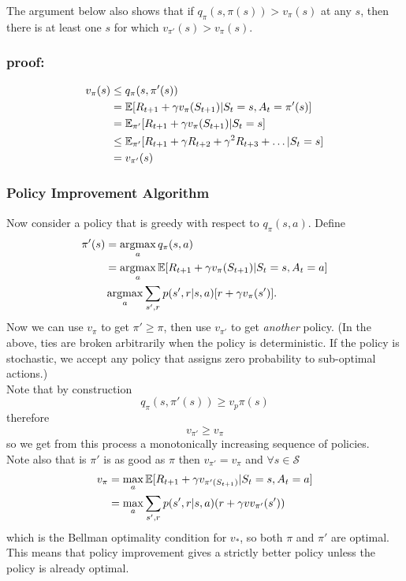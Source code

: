 The argument below also shows that if $q_\pi(s, \pi(s)) > v_\pi(s)$ at any $s$, then there is at least one $s$ for which $v_{\pi'}(s) > v_\pi(s)$.
\subsubsection*{proof:}
\begin{align*}
    v_\pi(s) & \leq q_\pi(s, \pi'(s)) \\
             & = \mathbb{E}{}[R_{t+1} + \gamma v_\pi(S_{t+1}) | S_t=s, A_t=\pi'(s)] \\
             & = \mathbb{E}{}_{\pi'} [R_{t+1} + \gamma v_\pi(S_{t+1}) | S_t=s] \\
             & \leq \mathbb{E}{}_{\pi'} [R_{t+1} + \gamma R_{t+2} + \gamma^2 R_{t+3} + \dots| S_t=s] \\
             & = v_{\pi'}(s)
\end{align*}

\subsubsection*{Policy Improvement Algorithm}
Now consider a policy that is greedy with respect to $q_\pi(s, a)$. Define 
\begin{align}
    \pi'(s) &= \operatorname*{argmax}_a q_\pi(s, a) \\ 
            &= \operatorname*{argmax}_a \mathbb{E}{} [R_{t+1} + \gamma v_\pi(S_{t+1}) | S_t=s, A_t=a] \\
            & \operatorname*{argmax}_a \sum_{s', r} p(s', r|s, a)[ r + \gamma v_\pi(s')].
\end{align}
Now we can use $v_\pi$ to get $\pi' \geq \pi$, then use $v_{\pi'}$ to get \emph{another} policy. (In the above, ties are broken arbitrarily when the policy is deterministic. If the policy is stochastic, we accept any policy that assigns zero probability to sub-optimal actions.)\\

Note that by construction
\[
    q_\pi(s, \pi'(s)) \geq v_p\pi(s)
\]
therefore
\[
    v_{\pi'} \geq v_\pi
\]
so we get from this process a monotonically increasing sequence of policies.\\

Note also that is $\pi'$ is as good as $\pi$ then $v_{\pi'} = v_\pi$ and $\forall s \in \mathcal{S}$
\begin{align*}
    v_\pi &= \max_a \mathbb{E}{}[R_{t+1} + \gamma v_{\pi'(S_{t+1})}| S_t=s, A_t=a]\\
          &= \max_a \sum_{s', r} p(s', r|s, a)(r + \gamma v v_{\pi'}(s'))
\end{align*}
which is the Bellman optimality condition for $v_*$, so both $\pi$ and $\pi'$ are optimal. This means that policy improvement gives a strictly better policy unless the policy is already optimal. \\

